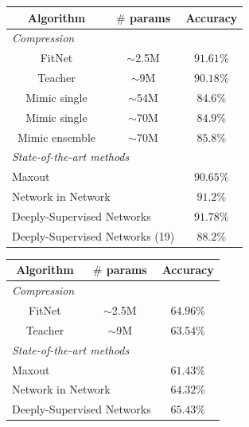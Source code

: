 \documentclass{article} %
\begin{document}
\begin{minipage}[b]{.45\textwidth}
\centering
\small
\begin{tabular}{|c|c|c|}
 \hline
 \textbf{Algorithm} & \textbf{$\#$ params}  & \textbf{Accuracy}\\ \hline
\hline
\multicolumn{3}{|l|}{\emph{Compression}} \\ \hline
FitNet  & $\sim$2.5M& $\mathbf{91.61\%}$  \\ \hline
Teacher & $\sim$9M& $90.18\%$ \\ \hline
Mimic single & $\sim$54M & $84.6\%$  \\ \hline 
Mimic single & $\sim$70M & $84.9\%$  \\ \hline 
Mimic ensemble & $\sim$70M & $85.8\%$  \\ \hline \hline 
\multicolumn{3}{|l|}{\emph{State-of-the-art methods}} \\ \hline
\multicolumn{2}{|l|}{Maxout} & $90.65\%$   \\ \hline
\multicolumn{2}{|l|}{Network in Network} & $91.2\%$  \\ \hline
\multicolumn{2}{|l|}{Deeply-Supervised Networks} & $\mathbf{91.78\%}$ \\ \hline
\multicolumn{2}{|l|}{Deeply-Supervised Networks (19)} & $88.2\%$  \\ \hline 
\end{tabular}
\label{tab:cifar10}
\end{minipage}\qquad
\begin{minipage}[b]{.45\textwidth}
\small
\centering
\begin{tabular}{|c|c|c|}
\hline
\textbf{Algorithm} & \textbf{$\#$ params}  & \textbf{Accuracy}\\ \hline
\hline
\multicolumn{3}{|l|}{\emph{Compression}} \\ \hline
FitNet & $\sim$2.5M& $\mathbf{64.96\%}$  \\ \hline
Teacher & $\sim$9M& $63.54\%$ \\ \hline \hline
\multicolumn{3}{|l|}{\emph{State-of-the-art methods}} \\ \hline
\multicolumn{2}{|l|}{Maxout} & $61.43\%$   \\ \hline
\multicolumn{2}{|l|}{Network in Network} & $64.32\%$  \\ \hline
\multicolumn{2}{|l|}{Deeply-Supervised Networks} & $\mathbf{65.43\%}$ \\ \hline
\end{tabular}
\label{tab:cifar100}
\end{minipage}
\end{document}
